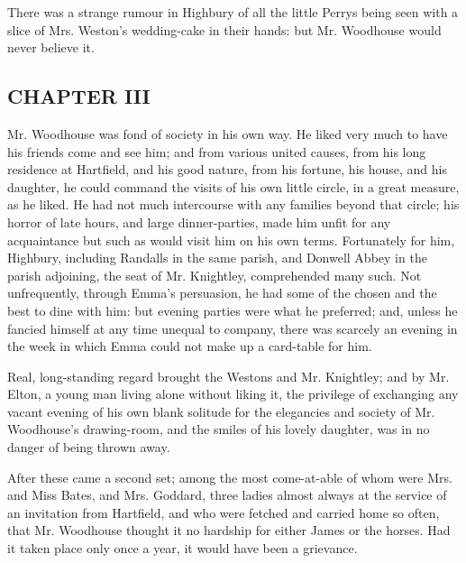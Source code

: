There was a strange rumour in Highbury of all the little Perrys being seen with a slice of Mrs. Weston's wedding-cake in their hands: but Mr. Woodhouse would never believe it.

\subsection[chapter-iii]{\useURL[url3][][][]\from[url3]CHAPTER III}

Mr. Woodhouse was fond of society in his own way. He liked very much to have his friends come and see him; and from various united causes, from his long residence at Hartfield, and his good nature, from his fortune, his house, and his daughter, he could command the visits of his own little circle, in a great measure, as he liked. He had not much intercourse with any families beyond that circle; his horror of late hours, and large dinner-parties, made him unfit for any acquaintance but such as would visit him on his own terms. Fortunately for him, Highbury, including Randalls in the same parish, and Donwell Abbey in the parish adjoining, the seat of Mr. Knightley, comprehended many such. Not unfrequently, through Emma's persuasion, he had some of the chosen and the best to dine with him: but evening parties were what he preferred; and, unless he fancied himself at any time unequal to company, there was scarcely an evening in the week in which Emma could not make up a card-table for him.

Real, long-standing regard brought the Westons and Mr. Knightley; and by Mr. Elton, a young man living alone without liking it, the privilege of exchanging any vacant evening of his own blank solitude for the elegancies and society of Mr. Woodhouse's drawing-room, and the smiles of his lovely daughter, was in no danger of being thrown away.

After these came a second set; among the most come-at-able of whom were Mrs. and Miss Bates, and Mrs. Goddard, three ladies almost always at the service of an invitation from Hartfield, and who were fetched and carried home so often, that Mr. Woodhouse thought it no hardship for either James or the horses. Had it taken place only once a year, it would have been a grievance.

